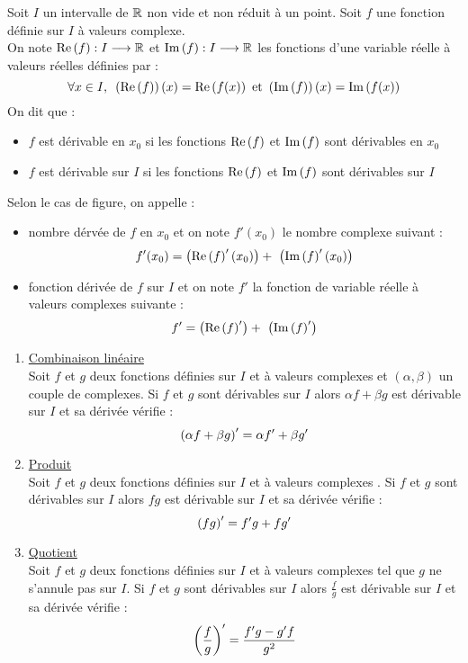 \begin{defprop}[Dérivation]
	Soit \(I\) un intervalle de \(\mathbb{R}\) non vide et non réduit à un point.
	Soit \(f\) une fonction définie sur \(I\) à valeurs complexe. \\
	On note \(\operatorname{Re}\left(f\right) :I \longrightarrow \mathbb{R}\) et \(\operatorname{Im}\left(f\right):I\longrightarrow\mathbb{R}\) les fonctions d’une variable réelle à valeurs réelles définies par :
	\[\quantifs{\forall x \in I}\paren{\Reel{f}}(x) = \Reel{f(x)} \text{ et } \paren{\Ima{f}}(x) = \Ima{f(x)} \]
	On dit que : \begin{itemize}
		\item \(f\) est dérivable en \(x_0\) si les fonctions \(\operatorname{Re}\left(f\right)\) et \( \operatorname{Im}\left(f\right) \) sont dérivables en \(x_0\)
		\item \(f\) est dérivable sur \(I\) si les fonctions \(\operatorname{Re}\left(f\right)\) et \( \operatorname{Im}\left(f\right) \) sont dérivables sur \(I\)
	\end{itemize}
	Selon le cas de figure, on appelle :
	\begin{itemize}
		\item nombre dérvée de \(f\) en \(x_0\) et on note \(f'(x_0)\) le nombre complexe suivant : \[f'(x_0) = \left(\operatorname{Re}\left(f\right)'(x_0)\right) + \ \left(\operatorname{Im}\left(f\right)'(x_0)\right)\]
		\item fonction dérivée de \(f\) sur \(I\) et on note \(f'\) la fonction de variable réelle à valeurs complexes suivante :
		      \[ f' = \paren{\Reel{f}'} + \ \paren{\Ima{f}'}\]
	\end{itemize}
\end{defprop}

\begin{prop}
	\begin{enumerate}
		\item \underline{Combinaison linéaire}\\
		      Soit \(f\) et \(g\) deux fonctions définies sur \(I\) et à valeurs complexes et \((\alpha, \beta)\) un couple de complexes. Si \(f\) et \(g\) sont dérivables sur \(I\) alors \(\alpha f + \beta g \) est dérivable sur \(I\) et sa dérivée vérifie :
		      \[\left(\alpha f + \beta g\right)' = \alpha f'+\beta g'\]
		\item \underline{Produit}\\
		      Soit \(f\) et \(g\) deux fonctions définies sur \(I\) et à valeurs complexes . Si \(f\) et \(g\) sont dérivables sur \(I\) alors \(fg\) est dérivable sur \(I\) et sa dérivée vérifie :
		      \[\left(fg\right)' = f'g+fg'\]

		\item \underline{Quotient}\\
		      Soit \(f\) et \(g\) deux fonctions définies sur \(I\) et à valeurs complexes tel que \(g\) ne s’annule pas sur \(I\). Si \(f\) et \(g\) sont dérivables sur \(I\) alors \(\frac{f}{g}\) est dérivable sur \(I\) et sa dérivée vérifie :
		      \[\left(\frac{f}{g}\right)' = \frac{f'g-g'f}{g^2}\]
	\end{enumerate}
\end{prop}

